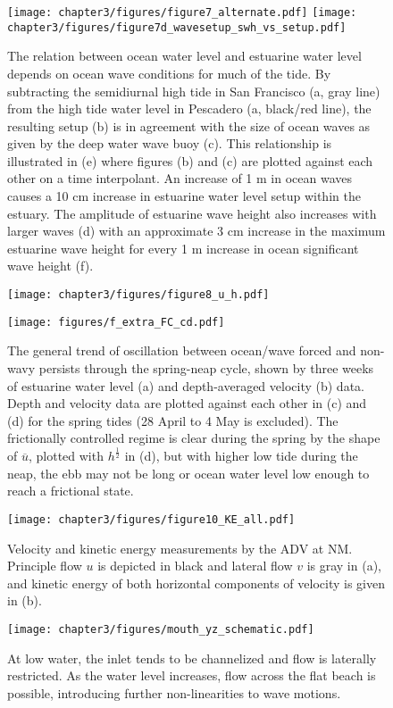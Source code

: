 \begin{figure}
\texttt{[image: chapter3/figures/figure7\_alternate.pdf]}
\texttt{[image: chapter3/figures/figure7d\_wavesetup\_swh\_vs\_setup.pdf]}\protect\caption{The relation between ocean water level and estuarine water level depends
on ocean wave conditions for much of the tide. By subtracting the
semidiurnal high tide in San Francisco (a, gray line) from the high
tide water level in Pescadero (a, black/red line), the resulting setup
(b) is in agreement with the size of ocean waves as given by the deep
water wave buoy (c). This relationship is illustrated in (e) where
figures (b) and (c) are plotted against each other on a time interpolant.
An increase of 1 m in ocean waves causes a 10 cm increase in estuarine
water level setup within the estuary. The amplitude of estuarine wave
height also increases with larger waves (d) with an approximate 3
cm increase in the maximum estuarine wave height for every 1 m increase
in ocean significant wave height (f). \label{f7_setup}}
\end{figure}


\begin{figure}
\texttt{[image: chapter3/figures/figure8\_u\_h.pdf]}

\texttt{[image: figures/f\_extra\_FC\_cd.pdf]}

\protect\caption{The general trend of oscillation between ocean/wave forced and non-wavy
persists through the spring-neap cycle, shown by three weeks of estuarine
water level (a) and depth-averaged velocity (b) data. Depth and velocity
data are plotted against each other in (c) and (d) for the spring
tides (28 April to 4 May is excluded). The frictionally controlled
regime is clear during the spring by the shape of $\overline{u}$,
plotted with $h^{\frac{1}{2}}$ in (d), but with higher low tide during
the neap, the ebb may not be long or ocean water level low enough
to reach a frictional state. \label{f8_ltHU}}
\end{figure}


\begin{figure}
\texttt{[image: chapter3/figures/figure10\_KE\_all.pdf]}\protect\caption{Velocity and kinetic energy measurements by the ADV at NM. Principle
flow $u$ is depicted in black and lateral flow $v$ is gray in (a),
and kinetic energy of both horizontal components of velocity is given
in (b). \label{f9_KE}}
\end{figure}


\begin{figure}
\texttt{[image: chapter3/figures/mouth\_yz\_schematic.pdf]}\protect\caption{At low water, the inlet tends to be channelized and flow is laterally
restricted. As the water level increases, flow across the flat beach
is possible, introducing further non-linearities to wave motions.
\label{f10_mouth_yz}}
\end{figure}



